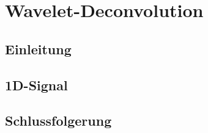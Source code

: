 %
%
%
\chapter{Wavelet-Deconvolution\label{chapter:deconvolve}}
\begin{refsection}

\section{Einleitung}


\section{1D-Signal}


\section{Schlussfolgerung}

\printbibliography[heading=subbibliography]
\end{refsection}
